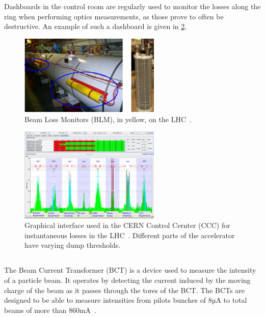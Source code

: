Dashboards in the control room are regularly used to monitor the losses along the ring when
performing optics measurements, as those prove to often be destructive. An example of such a
dashboard is given in \cref{fig:beam_instrumentation:blm2}.

\begin{figure}[H]
    \centering
    \includegraphics[width=0.6\textwidth]{images/blm.png}
    \caption{Beam Loss Monitors (BLM), in yellow, on the LHC~\cite{schmidt_machine_2014}.}
    \label{fig:beam_instrumentation:blm1}
\end{figure}

\begin{figure}[H]
    \centering
    \includegraphics[width=0.6\textwidth]{images/blm2.png}
    \caption{Graphical interface used in the CERN Control Cernter (CCC) for instantaneous losses in
    the LHC~\cite{schmidt_machine_2014}. Different parts of the accelerator have varying dump
    thresholds.}
    \label{fig:beam_instrumentation:blm2}
\end{figure}


\subsection{}

The Beam Current Transformer (BCT) is a device used to measure the intensity of a particle beam.
It operates by detecting the current induced by the moving charge of the beam as it passes through
the tores of the BCT.
The BCTs are designed to be able to measure intensities from pilots bunches of 8µA to total beams of
more than 860mA~\cite{odier_dcct_2009}.


